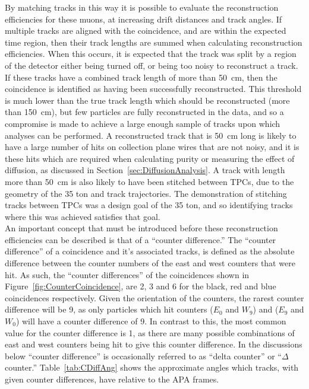 By matching tracks in this way it is possible to evaluate the reconstruction efficiencies for these muons, at increasing drift distances and track angles. If multiple tracks are aligned with the coincidence, and are within the expected time region, then their track lengths are summed when calculating reconstruction efficiencies. When this occurs, it is expected that the track was split by a region of the detector either being turned off, or being too noisy to reconstruct a track. If these tracks have a combined track length of more than 50~cm, then the coincidence is identified as having been successfully reconstructed. This threshold is much lower than the true track length which should be reconstructed (more than 150~cm), but few particles are fully reconstructed in the data, and so a compromise is made to achieve a large enough sample of tracks upon which analyses can be performed. A reconstructed track that is 50~cm long is likely to have a large number of hits on collection plane wires that are not noisy, and it is these hits which are required when calculating purity or measuring the effect of diffusion, as discussed in Section~\ref{sec:DiffusionAnalysis}. A track with length more than 50~cm is also likely to have been stitched between TPCs, due to the geometry of the 35 ton and track trajectories. The demonstration of stitching tracks between TPCs was a design goal of the 35 ton, and so identifying tracks where this was achieved satisfies that goal. \\

An important concept that must be introduced before these reconstruction efficiencies can be described is that of a ``counter difference.'' The ``counter difference'' of a coincidence and it's associated tracks, is defined as the absolute difference between the counter numbers of the east and west counters that were hit. As such, the ``counter differences'' of the coincidences shown in Figure~\ref{fig:CounterCoincidence}, are 2, 3 and 6 for the black, red and blue coincidences respectively. Given the orientation of the counters, the rarest counter difference will be 9, as only particles which hit counters ($E_0$ and $W_9$) and ($E_9$ and $W_0$) will have a counter difference of 9. In contrast to this, the most common value for the counter difference is 1, as there are many possible combinations of east and west counters being hit to give this counter difference. In the discussions below ``counter difference'' is occasionally referred to as ``delta counter'' or ``$\Delta$ counter.'' Table~\ref{tab:CDiffAng} shows the approximate angles which tracks, with given counter differences, have relative to the APA frames. \\

